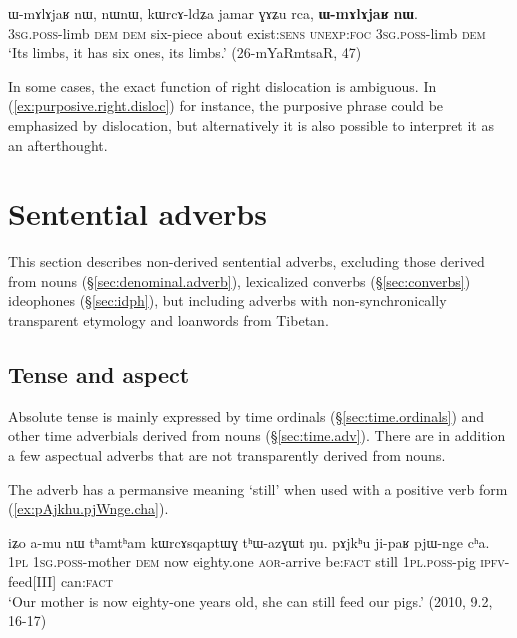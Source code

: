 \begin{exe}
\ex \label{ex:WmAlAjaR2}
\gll ɯ-mɤlɤjaʁ nɯ, nɯnɯ, kɯrcɤ-ldʑa jamar ɣɤʑu rca, \textbf{ɯ-mɤlɤjaʁ} \textbf{nɯ}. \\
\textsc{3sg}.\textsc{poss}-limb \textsc{dem} \textsc{dem} six-piece about exist:\textsc{sens} \textsc{unexp}:\textsc{foc} \textsc{3sg}.\textsc{poss}-limb \textsc{dem}  \\
\glt `Its limbs, it has six ones, its limbs.' (26-mYaRmtsaR, 47)
\end{exe}

In some cases, the exact function of right dislocation is ambiguous. In (\ref{ex:purposive.right.disloc}) for instance, the purposive phrase could be emphasized by dislocation, but alternatively it is also possible to interpret it as an afterthought.

\section{Sentential adverbs} \label{sec:sentential.adverbs}
This section describes non-derived sentential adverbs, excluding those derived from nouns (§\ref{sec:denominal.adverb}), lexicalized converbs (§\ref{sec:converbs})  ideophones (§\ref{sec:idph}), but including adverbs with non-synchronically transparent etymology and loanwords from Tibetan.
 
\subsection{Tense and aspect} \label{sec:tense.aspect.adverbs}
Absolute tense is mainly expressed by time ordinals (§\ref{sec:time.ordinals}) and other time adverbials derived from nouns (§\ref{sec:time.adv}). There are in addition a few aspectual adverbs that are not transparently derived from nouns.

The adverb  has a permansive meaning `still' when used with a positive verb form (\ref{ex:pAjkhu.pjWnge.cha}).

\begin{exe}
\ex \label{ex:pAjkhu.pjWnge.cha}
\gll iʑo a-mu nɯ tʰamtʰam kɯrcɤsqaptɯɣ tʰɯ-azɣɯt ŋu. pɤjkʰu ji-paʁ pjɯ-nge cʰa. \\
\textsc{1pl} \textsc{1sg}.\textsc{poss}-mother \textsc{dem} now eighty.one \textsc{aor}-arrive be:\textsc{fact} still \textsc{1pl}.\textsc{poss}-pig \textsc{ipfv}-feed[III] can:\textsc{fact} \\
 \glt `Our mother is now eighty-one years old, she can still feed our pigs.' (2010, 9.2, 16-17)
 \end{exe}
 
